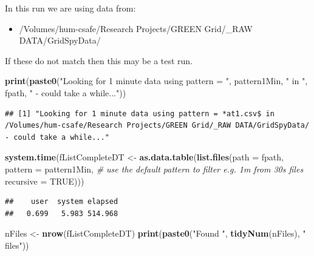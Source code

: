 \documentclass[]{article}
\newenvironment{Shaded}{\begin{snugshade}}{\end{snugshade}}
\newcommand{\KeywordTok}[1]{\textcolor[rgb]{0.13,0.29,0.53}{\textbf{#1}}}
\newcommand{\DataTypeTok}[1]{\textcolor[rgb]{0.13,0.29,0.53}{#1}}
\newcommand{\StringTok}[1]{\textcolor[rgb]{0.31,0.60,0.02}{#1}}
\newcommand{\CommentTok}[1]{\textcolor[rgb]{0.56,0.35,0.01}{\textit{#1}}}
\newcommand{\OtherTok}[1]{\textcolor[rgb]{0.56,0.35,0.01}{#1}}
\newcommand{\NormalTok}[1]{#1}
\providecommand{\tightlist}{%
  \setlength{\itemsep}{0pt}\setlength{\parskip}{0pt}}
\begin{document}
In this run we are using data from:

\begin{itemize}
\tightlist
\item
  /Volumes/hum-csafe/Research Projects/GREEN Grid/\_RAW
  DATA/GridSpyData/
\end{itemize}

If these do not match then this may be a test run.

\begin{Shaded}
\begin{Highlighting}[]
\KeywordTok{print}\NormalTok{(}\KeywordTok{paste0}\NormalTok{(}\StringTok{"Looking for 1 minute data using pattern = "}\NormalTok{, pattern1Min, }\StringTok{" in "}\NormalTok{, fpath, }\StringTok{" - could take a while..."}\NormalTok{))}
\end{Highlighting}
\end{Shaded}

\begin{verbatim}
## [1] "Looking for 1 minute data using pattern = *at1.csv$ in /Volumes/hum-csafe/Research Projects/GREEN Grid/_RAW DATA/GridSpyData/ - could take a while..."
\end{verbatim}

\begin{Shaded}
\begin{Highlighting}[]
\KeywordTok{system.time}\NormalTok{(fListCompleteDT <-}\StringTok{ }\KeywordTok{as.data.table}\NormalTok{(}\KeywordTok{list.files}\NormalTok{(}\DataTypeTok{path =}\NormalTok{ fpath, }\DataTypeTok{pattern =}\NormalTok{ pattern1Min, }\CommentTok{# use the default pattern to filter e.g. 1m from 30s files}
                                            \DataTypeTok{recursive =} \OtherTok{TRUE}\NormalTok{)))}
\end{Highlighting}
\end{Shaded}

\begin{verbatim}
##    user  system elapsed 
##   0.699   5.983 514.968
\end{verbatim}

\begin{Shaded}
\begin{Highlighting}[]
\NormalTok{nFiles <-}\StringTok{ }\KeywordTok{nrow}\NormalTok{(fListCompleteDT)}
\KeywordTok{print}\NormalTok{(}\KeywordTok{paste0}\NormalTok{(}\StringTok{"Found "}\NormalTok{, }\KeywordTok{tidyNum}\NormalTok{(nFiles), }\StringTok{" files"}\NormalTok{))}
\end{Highlighting}
\end{Shaded}
\end{document}
